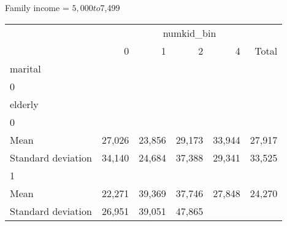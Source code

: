 Family income = $5,000 to $7,499
\begin{tabular}{llllll}
\cline{1-6}
\multicolumn{1}{c}{} &
  \multicolumn{5}{|c}{numkid\_bin} \\
\multicolumn{1}{c}{} &
  \multicolumn{1}{|r}{0} &
  \multicolumn{1}{r}{1} &
  \multicolumn{1}{r}{2} &
  \multicolumn{1}{r}{4} &
  \multicolumn{1}{r}{Total} \\
\cline{1-6}
\multicolumn{1}{l}{marital} &
  \multicolumn{1}{|r}{} &
  \multicolumn{1}{r}{} &
  \multicolumn{1}{r}{} &
  \multicolumn{1}{r}{} &
  \multicolumn{1}{r}{} \\
\multicolumn{1}{l}{\hspace{1em}0} &
  \multicolumn{1}{|r}{} &
  \multicolumn{1}{r}{} &
  \multicolumn{1}{r}{} &
  \multicolumn{1}{r}{} &
  \multicolumn{1}{r}{} \\
\multicolumn{1}{l}{\hspace{2em}elderly} &
  \multicolumn{1}{|r}{} &
  \multicolumn{1}{r}{} &
  \multicolumn{1}{r}{} &
  \multicolumn{1}{r}{} &
  \multicolumn{1}{r}{} \\
\multicolumn{1}{l}{\hspace{3em}0} &
  \multicolumn{1}{|r}{} &
  \multicolumn{1}{r}{} &
  \multicolumn{1}{r}{} &
  \multicolumn{1}{r}{} &
  \multicolumn{1}{r}{} \\
\multicolumn{1}{l}{\hspace{4em}Mean} &
  \multicolumn{1}{|r}{27,026} &
  \multicolumn{1}{r}{23,856} &
  \multicolumn{1}{r}{29,173} &
  \multicolumn{1}{r}{33,944} &
  \multicolumn{1}{r}{27,917} \\
\multicolumn{1}{l}{\hspace{4em}Standard deviation} &
  \multicolumn{1}{|r}{34,140} &
  \multicolumn{1}{r}{24,684} &
  \multicolumn{1}{r}{37,388} &
  \multicolumn{1}{r}{29,341} &
  \multicolumn{1}{r}{33,525} \\
\multicolumn{1}{l}{\hspace{3em}1} &
  \multicolumn{1}{|r}{} &
  \multicolumn{1}{r}{} &
  \multicolumn{1}{r}{} &
  \multicolumn{1}{r}{} &
  \multicolumn{1}{r}{} \\
\multicolumn{1}{l}{\hspace{4em}Mean} &
  \multicolumn{1}{|r}{22,271} &
  \multicolumn{1}{r}{39,369} &
  \multicolumn{1}{r}{37,746} &
  \multicolumn{1}{r}{27,848} &
  \multicolumn{1}{r}{24,270} \\
\multicolumn{1}{l}{\hspace{4em}Standard deviation} &
  \multicolumn{1}{|r}{26,951} &
  \multicolumn{1}{r}{39,051} &
  \multicolumn{1}{r}{47,865} &

\end{tabular}
